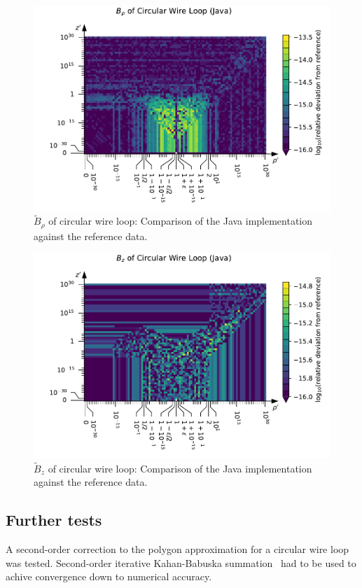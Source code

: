 \begin{figure}[htbp]
 \centering
 \includegraphics{img/CircularWireLoop_B_rho_Java.pdf}
 \caption{$\tilde{B}_\rho$ of circular wire loop: Comparison of the Java implementation against the reference data.}
 \label{fig:CircularWireLoop_B_rho_Java}
\end{figure}

\begin{figure}[htbp]
 \centering
 \includegraphics{img/CircularWireLoop_B_z_Java.pdf}
 \caption{$\tilde{B}_z$ of circular wire loop: Comparison of the Java implementation against the reference data.}
 \label{fig:CircularWireLoop_B_z_Java}
\end{figure}

\subsection{Further tests}

A second-order correction to the polygon approximation
for a circular wire loop~\cite{mcgreivy_2021} was tested.
Second-order iterative Kahan-Babuska summation~\cite{klein_2006} had to be used
to achive convergence down to numerical accuracy.

